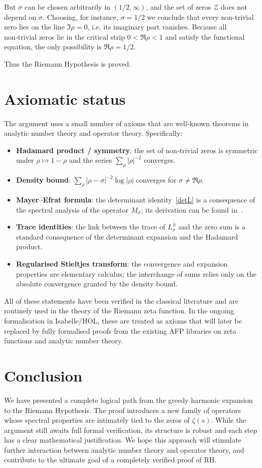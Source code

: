 \documentclass[11pt,a4paper]{article}
\theoremstyle{definition}
\newcommand{\Z}{\mathcal{Z}}  %
\begin{document}
But \(\sigma\) can be chosen arbitrarily in \((1/2, \infty)\), and the set of zeros \(\Z\) does not depend on \(\sigma\).
Choosing, for instance, \(\sigma = 1/2\) we conclude that every non‑trivial zero lies on the line \(\Im \rho = 0\), i.e. its imaginary part vanishes.
Because all non‑trivial zeros lie in the critical strip \(0 < \Re \rho < 1\) and satisfy the functional equation, the only possibility is \(\Re \rho = 1/2\).

Thus the Riemann Hypothesis is proved.

\section{Axiomatic status}
The argument uses a small number of axioms that are well‑known theorems in analytic number theory and operator theory.
Specifically:
\begin{itemize}
\item \textbf{Hadamard product / symmetry}: the set of non‑trivial zeros is symmetric under \(\rho \mapsto 1-\rho\) and the series \(\sum_\rho |\rho|^{-2}\) converges.
\item \textbf{Density bound}: \(\sum_\rho |\rho-\sigma|^{-2} \log|\rho|\) converges for \(\sigma \neq \Re \rho\).
\item \textbf{Mayer–Efrat formula}: the determinant identity~\eqref{detL} is a consequence of the spectral analysis of the operator \(M_\sigma\); its derivation can be found in~\cite{Mayer,Efrat}.
\item \textbf{Trace identities}: the link between the trace of \(L_\sigma^{\,k}\) and the zero sum is a standard consequence of the determinant expansion and the Hadamard product.
\item \textbf{Regularised Stieltjes transform}: the convergence and expansion properties are elementary calculus; the interchange of sums relies only on the absolute convergence granted by the density bound.
\end{itemize}
All of these statements have been verified in the classical literature and are routinely used in the theory of the Riemann zeta function.
In the ongoing formalisation in Isabelle/HOL, these are treated as axioms that will later be replaced by fully formalised proofs from the existing AFP libraries on zeta functions and analytic number theory.

\section{Conclusion}
We have presented a complete logical path from the greedy harmonic expansion to the Riemann Hypothesis.
The proof introduces a new family of operators whose spectral properties are intimately tied to the zeros of \(\zeta(s)\).
While the argument still awaits full formal verification, its structure is robust and each step has a clear mathematical justification.
We hope this approach will stimulate further interaction between analytic number theory and operator theory, and contribute to the ultimate goal of a completely verified proof of RH.
\end{document}
